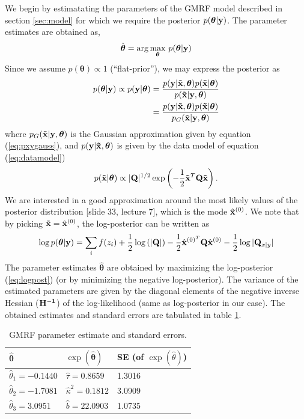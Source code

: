 \documentclass[a4paper,10pt]{article}
\def\bQ{{\bf Q}}
\def\bx{{\bf x}}
\def\by{{\bf y}}
\def\btx{{\bf{\tilde x}}}
\def\btheta{{\boldsymbol \theta}}
\def\bxmode{{\hat \bx^{(0)}}}
\begin{document}
We begin by estimatating the parameters of the GMRF model described in section \ref{sec:model} for which we require the posterior $p(\btheta|\by)$. The parameter estimates are obtained as,
\begin{equation*}
 \hat \btheta = \arg\max_{\btheta} \, p(\btheta|\by)
\end{equation*}
Since we assume $p(\btheta) \propto 1$ (``flat-prior''), we may express the posterior as
\begin{align*}
 p(\btheta|\by) \propto p(\by|\btheta) &= \frac{p(\by|\btx, \btheta) p(\btx|\btheta)}{p(\btx|\by, \btheta)} \\
 &= \frac{p(\by|\btx, \btheta) p(\btx|\btheta)}{p_G(\btx|\by, \btheta)}
\end{align*}
where $p_G(\btx|\by, \btheta)$ is the Gaussian approximation given by equation (\ref{eq:pxygauss}), and $p(\by|\btx, \btheta)$ is given by the data model of equation (\ref{eq:datamodel})
\begin{equation*}
 p(\btx|\btheta) \propto |\bQ|^{1/2} \exp \left(-\frac{1}{2} \btx^T \bQ \btx \right).
\end{equation*}
We are interested in a good approximation around the most likely values of the posterior distribution [slide 33, lecture 7], which is the mode $\hat \bx^{(0)}$. We note that by picking $\btx = \bxmode$, the log-posterior can be written as
\begin{equation}
 \log p(\btheta|\by) = \sum_i f(z_i) + \frac{1}{2} \log\left( |\bQ| \right) - \frac{1}{2} \hat \bx^{(0)^T} \bQ \bxmode - \frac{1}{2} \log |\bQ_{x|y}|
 \label{eq:logpost}
\end{equation}
The parameter estimates $\hat \btheta$ are obtained by maximizing the log-posterior (\ref{eq:logpost}) (or by minimizing the negative log-posterior). The variance of the estimated parameters are given by the diagonal elements of the negative inverse Hessian ($\bf H^{-1}$) of the log-likelihood (same as log-posterior in our case). The obtained estimates and standard errors are tabulated in table \ref{tab:gmrfparest}.	
\begin{table}[H]
\centering
\begin{tabular}{lll}
\hline
{\bf $\hat \btheta$} & {$\exp(\hat \btheta)$} & {\bf SE} (of $\exp(\hat \theta)$) \\
\hline
$\hat \theta_1 =   -0.1440$ & $\hat \tau = 0.8659 $ & 1.3016 \\
$\hat \theta_2 = -1.7081$ & $\hat \kappa^2 = 0.1812 $ &  3.0909 \\
$\hat \theta_3 = 3.0951$ & $\hat b = 22.0903$ & 1.0735 \\
\hline
\end{tabular}
\caption{GMRF parameter estimate and standard errors.}
\label{tab:gmrfparest}
\end{table}
\end{document}
